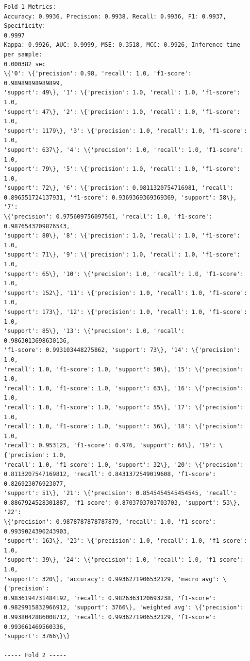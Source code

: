 \documentclass[11pt]{article}
\begin{document}
    \begin{Verbatim}[commandchars=\\\{\}]
Fold 1 Metrics:
Accuracy: 0.9936, Precision: 0.9938, Recall: 0.9936, F1: 0.9937, Specificity:
0.9997
Kappa: 0.9926, AUC: 0.9999, MSE: 0.3518, MCC: 0.9926, Inference time per sample:
0.000382 sec
\{'0': \{'precision': 0.98, 'recall': 1.0, 'f1-score': 0.98989898989899,
'support': 49\}, '1': \{'precision': 1.0, 'recall': 1.0, 'f1-score': 1.0,
'support': 47\}, '2': \{'precision': 1.0, 'recall': 1.0, 'f1-score': 1.0,
'support': 1179\}, '3': \{'precision': 1.0, 'recall': 1.0, 'f1-score': 1.0,
'support': 637\}, '4': \{'precision': 1.0, 'recall': 1.0, 'f1-score': 1.0,
'support': 79\}, '5': \{'precision': 1.0, 'recall': 1.0, 'f1-score': 1.0,
'support': 72\}, '6': \{'precision': 0.9811320754716981, 'recall':
0.896551724137931, 'f1-score': 0.9369369369369369, 'support': 58\}, '7':
\{'precision': 0.975609756097561, 'recall': 1.0, 'f1-score': 0.9876543209876543,
'support': 80\}, '8': \{'precision': 1.0, 'recall': 1.0, 'f1-score': 1.0,
'support': 71\}, '9': \{'precision': 1.0, 'recall': 1.0, 'f1-score': 1.0,
'support': 65\}, '10': \{'precision': 1.0, 'recall': 1.0, 'f1-score': 1.0,
'support': 152\}, '11': \{'precision': 1.0, 'recall': 1.0, 'f1-score': 1.0,
'support': 173\}, '12': \{'precision': 1.0, 'recall': 1.0, 'f1-score': 1.0,
'support': 85\}, '13': \{'precision': 1.0, 'recall': 0.9863013698630136,
'f1-score': 0.993103448275862, 'support': 73\}, '14': \{'precision': 1.0,
'recall': 1.0, 'f1-score': 1.0, 'support': 50\}, '15': \{'precision': 1.0,
'recall': 1.0, 'f1-score': 1.0, 'support': 63\}, '16': \{'precision': 1.0,
'recall': 1.0, 'f1-score': 1.0, 'support': 55\}, '17': \{'precision': 1.0,
'recall': 1.0, 'f1-score': 1.0, 'support': 56\}, '18': \{'precision': 1.0,
'recall': 0.953125, 'f1-score': 0.976, 'support': 64\}, '19': \{'precision': 1.0,
'recall': 1.0, 'f1-score': 1.0, 'support': 32\}, '20': \{'precision':
0.8113207547169812, 'recall': 0.8431372549019608, 'f1-score': 0.826923076923077,
'support': 51\}, '21': \{'precision': 0.8545454545454545, 'recall':
0.8867924528301887, 'f1-score': 0.8703703703703703, 'support': 53\}, '22':
\{'precision': 0.9878787878787879, 'recall': 1.0, 'f1-score': 0.9939024390243903,
'support': 163\}, '23': \{'precision': 1.0, 'recall': 1.0, 'f1-score': 1.0,
'support': 39\}, '24': \{'precision': 1.0, 'recall': 1.0, 'f1-score': 1.0,
'support': 320\}, 'accuracy': 0.9936271906532129, 'macro avg': \{'precision':
0.9836194731484192, 'recall': 0.9826363120693238, 'f1-score':
0.9829915832966912, 'support': 3766\}, 'weighted avg': \{'precision':
0.9938042886008712, 'recall': 0.9936271906532129, 'f1-score': 0.993661469560336,
'support': 3766\}\}

----- Fold 2 -----

    \end{Verbatim}
\end{document}
